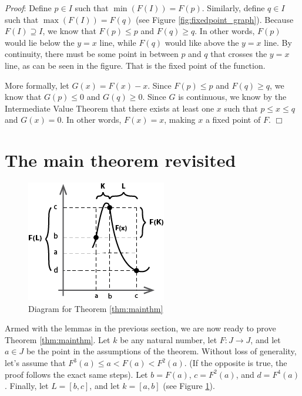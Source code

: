 \documentclass[12pt]{IEEEtran}
\begin{document}
{\it Proof}: Define $p \in I$ such that $\min \left( F \left( I \right) \right) = F \left( p \right)$. Similarly, define $q \in I$ such that $\max \left( F \left( I \right) \right) = F \left( q \right)$ (see Figure \ref{fig:fixedpoint_graph}). Because $F \left( I \right) \supseteq I$, we know that $F \left( p \right) \leq p$ and $F \left( q \right) \geq q$. In other words, $F \left( p \right)$ would lie below the $y=x$ line, while $F \left( q \right)$ would like above the $y=x$ line. By continuity, there must be some point in between $p$ and $q$ that crosses the $y=x$ line, as can be seen in the figure. That is the fixed point of the function.

More formally, let $G \left( x \right) = F \left( x \right) - x$. Since $F \left( p \right) \leq p$ and $F \left( q \right) \geq q$, we know that $G \left( p \right) \leq 0$ and $G \left( q \right) \geq 0$. Since $G$ is continuous, we know by the Intermediate Value Theorem that there exists at least one $x$ such that $p \leq x \leq q$ and $G \left( x \right) = 0$. In other words, $F \left(x \right) = x$, making $x$ a fixed point of $F$. $\Box$


\section{The main theorem revisited}

\begin{figure}
	\begin{center}
		\includegraphics{img/mainthm_graph.png}
		\caption{Diagram for Theorem \ref{thm:mainthm}}
        \label{fig:mainthm_graph}
	\end{center}
\end{figure}

Armed with the lemmas in the previous section, we are now ready to prove Theorem \ref{thm:mainthm}. Let $k$ be any natural number, let $F : J \rightarrow J$, and let $a \in J$ be the point in the assumptions of the theorem. Without loss of generality, let's assume that $F^3\left(a\right) \leq a < F\left(a\right) < F^2\left(a\right)$. (If the opposite is true, the proof follows the exact same steps). Let $b = F \left( a \right)$, $c = F ^2 \left( a \right)$, and $d = F^4  \left( a \right)$. Finally, let $L = \left[ b, c \right]$, and let $k = \left[ a,b \right]$ (see Figure \ref{fig:mainthm_graph}).
\end{document}
